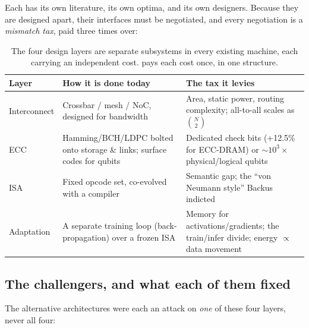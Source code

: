 Each has its own literature, its own optima, and its own designers. Because
they are designed apart, their interfaces must be negotiated, and every
negotiation is a \emph{mismatch tax}, paid three times over:

\begin{table}[H]
\centering
\small
\caption{The four design layers are separate subsystems in every existing
machine, each carrying an independent cost. \TALOS{} pays each cost once, in
one structure.}
\label{tab:four-layers}
\begin{tabular}{@{}p{2.4cm}p{4.6cm}p{5.2cm}@{}}
\toprule
\textbf{Layer} & \textbf{How it is done today} & \textbf{The tax it levies} \\
\midrule
Interconnect & Crossbar / mesh / NoC, designed for bandwidth & Area, static power, routing complexity; all-to-all scales as $\binom{N}{2}$ \\
ECC & Hamming/BCH/LDPC bolted onto storage \& links; surface codes for qubits & Dedicated check bits (+12.5\% for ECC-DRAM) or $\sim\!10^3\times$ physical/logical qubits \\
ISA & Fixed opcode set, co-evolved with a compiler & Semantic gap; the ``von Neumann style'' Backus indicted \\
Adaptation & A separate training loop (back-propagation) over a frozen ISA & Memory for activations/gradients; the train/infer divide; energy $\propto$ data movement \\
\bottomrule
\end{tabular}
\end{table}

\subsection{The challengers, and what each of them fixed}

The alternative architectures were each an attack on \emph{one} of these
four layers, never all four:

